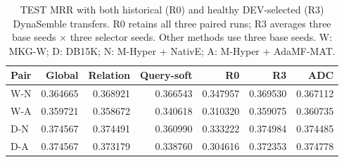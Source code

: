 \begin{table}[htbp]
\centering\footnotesize
\setlength{\tabcolsep}{4pt}
\caption{TEST MRR with both historical (R0) and healthy DEV-selected (R3) DynaSemble transfers. R0 retains all three paired runs; R3 averages three base seeds $\times$ three selector seeds. Other methods use three base seeds. W: MKG-W; D: DB15K; N: M-Hyper + NativE; A: M-Hyper + AdaMF-MAT.}
\label{tab:dyna-main}
\begin{tabular}{lrrrrrr}
\toprule
Pair & Global & Relation & Query-soft & R0 & R3 & ADC\\
\midrule
W-N & 0.364665 & 0.368921 & 0.366543 & 0.347957 & 0.369530 & 0.367112\\
W-A & 0.359721 & 0.358672 & 0.340618 & 0.310320 & 0.359075 & 0.360735\\
D-N & 0.374567 & 0.374491 & 0.360990 & 0.333222 & 0.374984 & 0.374485\\
D-A & 0.374567 & 0.373179 & 0.338760 & 0.304616 & 0.372353 & 0.374778\\
\bottomrule
\end{tabular}
\end{table}
